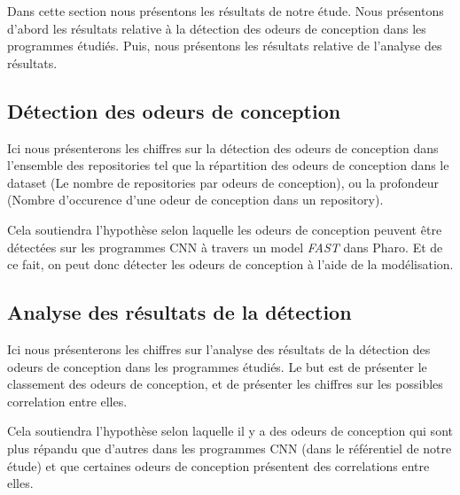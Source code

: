 \label{sec:results}
Dans cette section nous présentons les résultats de notre étude. Nous présentons
d'abord les résultats relative à la détection des odeurs de conception dans les
programmes étudiés. Puis, nous présentons les résultats relative de l'analyse des
résultats.

\subsection{Détection des odeurs de conception}
\label{sec:results1}
Ici nous présenterons les chiffres sur la détection des odeurs de conception
dans l'ensemble des repositories tel que la répartition des odeurs de
conception dans le dataset (Le nombre de repositories par odeurs de conception),
ou la profondeur (Nombre d'occurence d'une odeur de conception dans un
repository).


Cela soutiendra l'hypothèse selon laquelle les odeurs de conception peuvent être
détectées sur les programmes CNN à travers un model \emph{FAST} dans Pharo. Et de ce
fait, on peut donc détecter les odeurs de conception à l'aide de la modélisation.




\subsection{Analyse des résultats de la détection}
\label{sec:results2}
Ici nous présenterons les chiffres sur l'analyse des résultats de la détection
des odeurs de conception dans les programmes étudiés. Le but est de présenter le
classement des odeurs de conception, et de présenter les chiffres sur les
possibles correlation entre elles.

Cela soutiendra l'hypothèse selon laquelle il y a des odeurs de conception qui sont plus répandu que d'autres dans
les programmes CNN (dans le référentiel de notre étude) et que certaines odeurs
de conception présentent des correlations entre elles.


